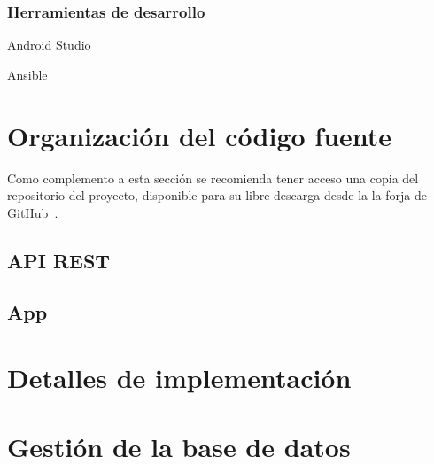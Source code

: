 \subsubsection{Herramientas de desarrollo}

Android Studio

Ansible 

\section{Organización del código fuente}

Como complemento a esta sección se recomienda tener acceso una copia del
repositorio del proyecto, disponible para su libre descarga desde la
la forja de GitHub~\cite{forja}.

\subsection{API REST}

\subsection{App}


\section{Detalles de implementación}

\section{Gestión de la base de datos}
